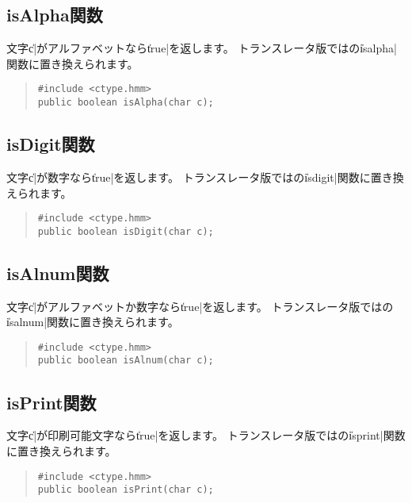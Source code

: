 \subsection{isAlpha関数}

文字\|c|がアルファベットなら\|true|を返します。
トランスレータ版では\cl の\|isalpha|関数に置き換えられます。

\begin{quote}
\begin{verbatim}
#include <ctype.hmm>
public boolean isAlpha(char c);
\end{verbatim}
\end{quote}

\subsection{isDigit関数}

文字\|c|が数字なら\|true|を返します。
トランスレータ版では\cl の\|isdigit|関数に置き換えられます。

\begin{quote}
\begin{verbatim}
#include <ctype.hmm>
public boolean isDigit(char c);
\end{verbatim}
\end{quote}

\subsection{isAlnum関数}

文字\|c|がアルファベットか数字なら\|true|を返します。
トランスレータ版では\cl の\|isalnum|関数に置き換えられます。

\begin{quote}
\begin{verbatim}
#include <ctype.hmm>
public boolean isAlnum(char c);
\end{verbatim}
\end{quote}

\subsection{isPrint関数}

文字\|c|が印刷可能文字なら\|true|を返します。
トランスレータ版では\cl の\|isprint|関数に置き換えられます。

\begin{quote}
\begin{verbatim}
#include <ctype.hmm>
public boolean isPrint(char c);
\end{verbatim}
\end{quote}

